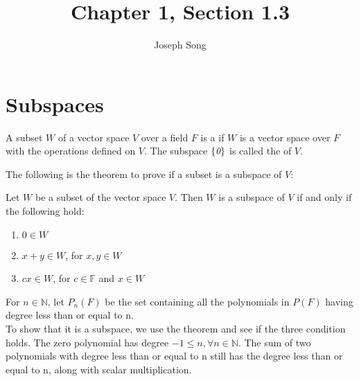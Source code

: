 \documentclass{article}
\title{Chapter 1, Section 1.3}
\author{Joseph Song}
\date{}
\begin{document}
\maketitle

\section{Subspaces}

\begin{definition}[Subspace]
A subset $W$ of a vector space $V$ over a field $F$ is a  if $W$ is a vector space over $F$ with the operations defined on $V$. The subspace $\{ \emph{0} \}$ is called the  of $V$.
\end{definition}

The following is the theorem to prove if a subset is a subspace of $V$:

\begin{theorem}
    Let $W$ be a subset of the vector space $V$. Then $W$ is a subspace of $V$ if and only if the following hold:
\end{theorem}
\begin{enumerate}[label=(\arabic*)]
    \item $0 \in W$
    \item $x + y \in W$, for $x, y \in W$
    \item $cx \in W$, for $c \in \mathbb{F}$ and $x \in W$
\end{enumerate}
\begin{example}[Polynomials]
\end{example}
For $n \in \mathbb{N}$, let $P_n(F)$ be the set containing all the polynomials in $P(F)$ having degree less than or equal to n.
\\
To show that it is a subspace, we use the theorem and see if the three condition holds. The zero polynomial has degree $-1 \leq n, \forall n \in \mathbb{N}$.
The sum of two polynomials with degree less than or equal to n still has the degree less than or equal to n, along with scalar multiplication.
\end{document}
